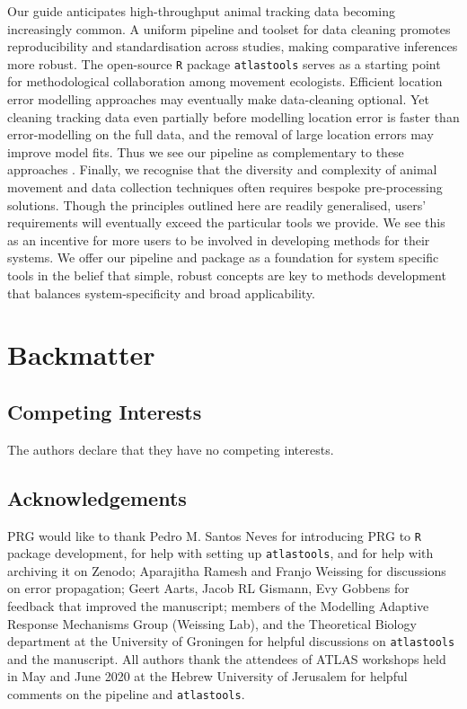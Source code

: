 \documentclass[10pt,paper=a4,headings=standardclasses
]{scrartcl}
\begin{document}
Our guide anticipates high-throughput animal tracking data becoming increasingly common.
A uniform pipeline and toolset for data cleaning promotes reproducibility and standardisation across studies, making comparative inferences more robust.
The open-source \texttt{R} package \texttt{atlastools} serves as a starting point for methodological collaboration among movement ecologists.
Efficient location error modelling approaches \citep{fleming2020,aspillaga2021} may eventually make data-cleaning optional.
Yet cleaning tracking data even partially before modelling location error is faster than error-modelling on the full data, and the removal of large location errors may improve model fits.
Thus we see our pipeline as complementary to these approaches \citep{fleming2014a,fleming2020}.
Finally, we recognise that the diversity and complexity of animal movement and data collection techniques often requires bespoke pre-processing solutions.
Though the principles outlined here are readily generalised, users' requirements will eventually exceed the particular tools we provide.
We see this as an incentive for more users to be involved in developing methods for their systems.
We offer our pipeline and package as a foundation for system specific tools in the belief that simple, robust concepts are key to methods development that balances system-specificity and broad applicability.

\section{Backmatter}

\subsection{Competing Interests}

The authors declare that they have no competing interests.

\subsection{Acknowledgements}

PRG would like to thank Pedro M. Santos Neves for introducing PRG to \texttt{R} package development, for help with setting up \texttt{atlastools}, and for help with archiving it on Zenodo; 
Aparajitha Ramesh and Franjo Weissing for discussions on error propagation;
Geert Aarts, Jacob RL Gismann, Evy Gobbens for feedback that improved the manuscript; 
members of the Modelling Adaptive Response Mechanisms Group (Weissing Lab), and the Theoretical Biology department at the University of Groningen for helpful discussions on \texttt{atlastools} and the manuscript.
All authors thank the attendees of ATLAS workshops held in May and June 2020 at the Hebrew University of Jerusalem for helpful comments on the pipeline and \texttt{atlastools}.
\end{document}
